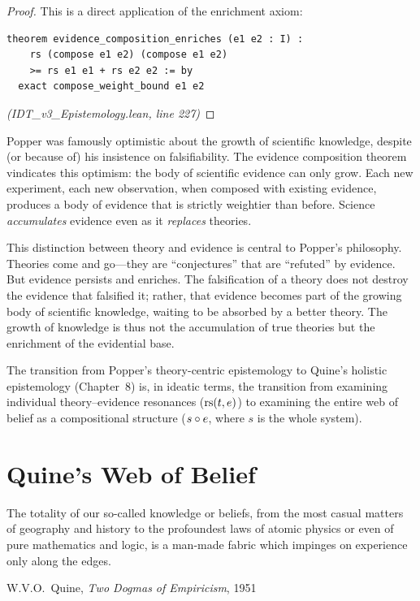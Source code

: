\begin{proof}
This is a direct application of the enrichment axiom:
\begin{lstlisting}
theorem evidence_composition_enriches (e1 e2 : I) :
    rs (compose e1 e2) (compose e1 e2)
    >= rs e1 e1 + rs e2 e2 := by
  exact compose_weight_bound e1 e2
\end{lstlisting}
\textit{(IDT\_v3\_Epistemology.lean, line 227)}
\end{proof}

\begin{interpretation}
Popper was famously optimistic about the growth of scientific knowledge, despite
(or because of) his insistence on falsifiability. The evidence composition theorem
vindicates this optimism: the body of scientific evidence can only grow. Each new
experiment, each new observation, when composed with existing evidence, produces
a body of evidence that is strictly weightier than before. Science \emph{accumulates}
evidence even as it \emph{replaces} theories.

This distinction between theory and evidence is central to Popper's philosophy.
Theories come and go---they are ``conjectures'' that are ``refuted'' by evidence.
But evidence persists and enriches. The falsification of a theory does not destroy
the evidence that falsified it; rather, that evidence becomes part of the growing
body of scientific knowledge, waiting to be absorbed by a better theory. The growth
of knowledge is thus not the accumulation of true theories but the enrichment of
the evidential base.

The transition from Popper's theory-centric epistemology to Quine's holistic
epistemology (Chapter~8) is, in ideatic terms, the transition from examining
individual theory--evidence resonances ($\mathrm{rs}(t, e)$) to examining the entire
web of belief as a compositional structure ($s \circ e$, where $s$ is the
whole system).
\end{interpretation}



\chapter{Quine's Web of Belief}
\label{ch:quine}

\epigraph{The totality of our so-called knowledge or beliefs, from the most casual matters of geography and history to the profoundest laws of atomic physics or even of pure mathematics and logic, is a man-made fabric which impinges on experience only along the edges.}{W.V.O.\ Quine, \textit{Two Dogmas of Empiricism}, 1951}

